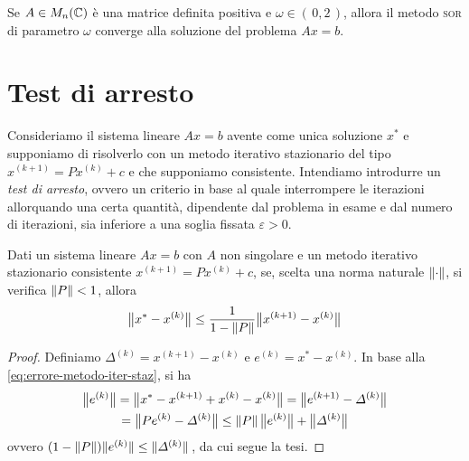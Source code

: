 	\begin{teorema}\label{th:ostrowski-reich}
		Se \(A \in M_n (\mathbb{C})\) è una matrice definita positiva e \(\omega \in (\, 0, 2 \,)\), allora il metodo \textsc{sor} di parametro \(\omega\) converge alla soluzione del problema \(A x = b\).
	\end{teorema}

\section{Test di arresto}
	
	\noindent Consideriamo il sistema lineare \(A x = b\) avente come unica soluzione \(x^*\) e supponiamo di risolverlo con un metodo iterativo stazionario del tipo \(x^{(k + 1)} = P x^{(k)} + c\) e che supponiamo consistente. Intendiamo introdurre un \emph{test di arresto}, ovvero un criterio in base al quale interrompere le iterazioni allorquando una certa quantità, dipendente dal problema in esame e dal numero di iterazioni, sia inferiore a una soglia fissata \(\varepsilon > 0\).
	
	\begin{proposizione}\label{prop:stima-posteriori-crit-step}
		Dati un sistema lineare \(A x = b\) con \(A\) non singolare e un metodo iterativo stazionario consistente \(x^{(k + 1)} = P x^{(k)} + c\), se, scelta una norma naturale \(\norm{\cdot}\), si verifica \(\norm{P} < 1\), allora
		\begin{equation}\label{eq:stima-posteriori-crit-step}
			\bigl\| x^* - x^{(k)} \bigr\| \le \frac{1}{1 - \norm{P}} \bigl\| x^{(k + 1)} - x^{(k)} \bigr\|
		\end{equation}
	\end{proposizione}

	\begin{proof}
		Definiamo \(\varDelta^{(k)} = x^{(k + 1)} - x^{(k)}\) e \(e^{(k)} = x^* - x^{(k)}\). In base alla \eqref{eq:errore-metodo-iter-staz}, si ha
		\begin{multline*}
			\bigl\| e^{(k)} \bigr\| = \bigl\| x^* - x^{(k + 1)} + x^{(k)} - x^{(k)} \bigr\| = \bigl\| e^{(k + 1)} - \varDelta^{(k)} \bigr\| \\
			= \bigl\| P e^{(k)} - \varDelta^{(k)} \bigr\| \le \norm{P} \, \bigl\| e^{(k)} \bigr\| + \bigl\| \varDelta^{(k)}\bigr\|
		\end{multline*}
		ovvero \((1 - \norm{P}) \norm*{e^{(k)}} \! \le \norm*{\varDelta^{(k)}}\), da cui segue la tesi.
	\end{proof}

